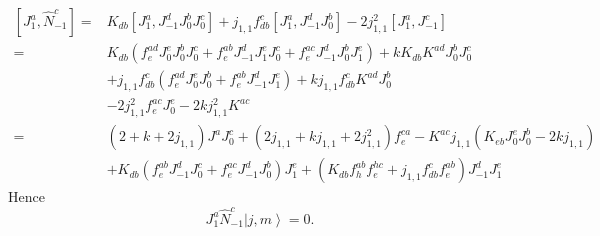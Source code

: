 \documentclass[10pt,a4paper]{article}
\numberwithin{equation}{section}
\newcommand{\ket}[1]{\left| #1 \right\rangle}
\begin{document}
\begin{equation}
    \begin{aligned}
        \left[ J^{a}_{1}, \hat{N}^{c}_{-1} \right] 
        =& K_{db} \left[J^{a}_{1}, J^{d}_{-1}J^{b}_{0}J^{c}_{0} \right] + 
            j_{1,1}f^{c}_{db}\left[J^{a}_{1},J^{d}_{-1}J^{b}_{0}\right] - 2 j^{2}_{1,1} \left[J^{a}_{1},J^{c}_{-1}\right]\\
        =& K_{db} \left(f^{ad}_{e}J^{e}_{0}J^{b}_{0}J^{c}_{0} + f^{ab}_{e}J^{d}_{-1}J^{e}_{1}J^{c}_{0} + f^{ac}_{e}J^{d}_{-1}J^{b}_{0}J^{e}_{1}\right) + k K_{db}K^{ad}J^{b}_{0}J^{c}_{0}\\
            &+ j_{1,1}f^{c}_{db} \left( f^{ad}_{e} J^{e}_{0}J^{b}_{0} + f^{ab}_{e} J^{d}_{-1} J^{e}_{1} \right) + kj_{1,1}f^{c}_{db}K^{ad}J^{b}_{0}\\
            &-2 j^{2}_{1,1} f^{ac}_{e} J^{e}_{0}-2 k j^{2}_{1,1}K^{ac}\\
        =& (2+k+2j_{1,1})J^{a}J^{c}_{0} + (2j_{1,1} + kj_{1,1}+2j^{2}_{1,1})f^{ca}_{e} - K^{ac}j_{1,1}(K_{eb}J^{e}_{0}J^{b}_{0}-2k j_{1,1})\\
            &+ K_{db}\left(f^{ab}_{e}J^{d}_{-1}J^{c}_{0} + f^{ac}_{e}J^{d}_{-1}J^{b}_{0} \right)J^{e}_{1}
             + \left(K_{db}f^{ab}_{h}f^{hc}_{e} + j_{1,1}f^{c}_{db}f^{ab}_{e}\right)J^{d}_{-1}J^{e}_{1}
    \end{aligned}
\end{equation}
Hence 
\begin{equation}
    J^{a}_{1} \hat{N}^{c}_{-1} \ket{j,m} = 0.
\end{equation}
\end{document}
